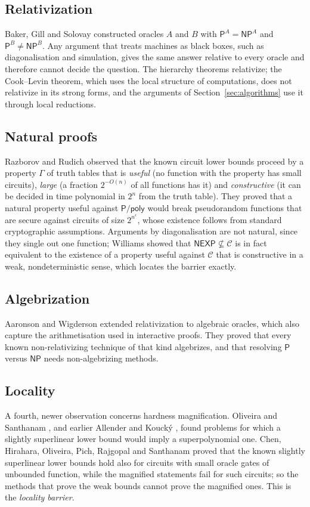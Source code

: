 \documentclass[11pt,reqno]{amsart}
\numberwithin{equation}{section}
\theoremstyle{plain}
\theoremstyle{definition}
\theoremstyle{remark}
\newcommand{\Pc}{\mathsf{P}}
\newcommand{\NP}{\mathsf{NP}}
\newcommand{\NEXP}{\mathsf{NEXP}}
\newcommand{\Ppoly}{\mathsf{P}/\mathsf{poly}}
\begin{document}
\subsection{Relativization}
Baker, Gill and Solovay \cite{BGS75} constructed oracles $A$ and $B$ with
$\Pc^A=\NP^A$ and $\Pc^B\ne\NP^B$. Any argument that treats machines as black
boxes, such as diagonalisation and simulation, gives the same answer relative
to every oracle and therefore cannot decide the question. The hierarchy
theorems relativize; the Cook--Levin theorem, which uses the local structure of
computations, does not relativize in its strong forms, and the arguments of
Section~\ref{sec:algorithms} use it through local reductions.

\subsection{Natural proofs}
Razborov and Rudich \cite{RR97} observed that the known circuit lower bounds
proceed by a property $\Gamma$ of truth tables that is \emph{useful} (no
function with the property has small circuits), \emph{large} (a fraction
$2^{-O(n)}$ of all functions has it) and \emph{constructive} (it can be
decided in time polynomial in $2^n$ from the truth table). They proved that a
natural property useful against $\Ppoly$ would break pseudorandom functions
that are secure against circuits of size $2^{n^\epsilon}$, whose existence
follows from standard cryptographic assumptions. Arguments by diagonalisation
are not natural, since they single out one function; Williams \cite{Wil16}
showed that $\NEXP\not\subseteq\mathcal C$ is in fact equivalent to the
existence of a property useful against $\mathcal C$ that is constructive in a
weak, nondeterministic sense, which locates the barrier exactly.

\subsection{Algebrization}
Aaronson and Wigderson \cite{AW09} extended relativization to algebraic
oracles, which also capture the arithmetisation used in interactive proofs.
They proved that every known non-relativizing technique of that kind
algebrizes, and that resolving $\Pc$ versus $\NP$ needs non-algebrizing
methods.

\subsection{Locality}
A fourth, newer observation concerns hardness magnification. Oliveira and
Santhanam \cite{OS18}, and earlier Allender and Kouck\'y \cite{AK10}, found
problems for which a slightly superlinear lower bound would imply a
superpolynomial one. Chen, Hirahara, Oliveira, Pich, Rajgopal and Santhanam
\cite{CHOPRS22} proved that the known slightly superlinear lower bounds hold
also for circuits with small oracle gates of unbounded function, while the
magnified statements fail for such circuits; so the methods that prove the weak
bounds cannot prove the magnified ones. This is the \emph{locality barrier}.
\end{document}
